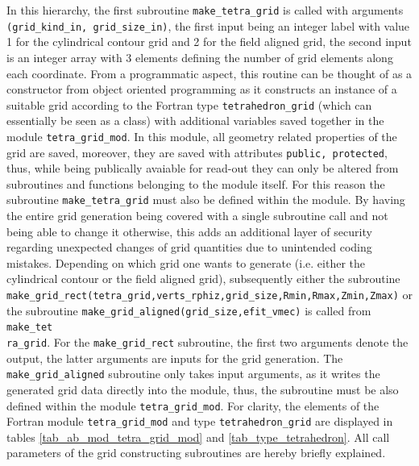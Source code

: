 \documentclass[./main.tex]{subfiles}
\begin{document}
In this hierarchy, the first subroutine \texttt{make\_tetra\_grid} is called with arguments \texttt{(grid\_kind\_in, grid\_size\_in)}, the first input being an integer label with value 1 for the cylindrical contour grid and 2 for the field aligned grid, the second input is an integer array with 3 elements defining the number of grid elements along each coordinate. From a programmatic aspect, this routine can be thought of as a constructor from object oriented programming as it constructs an instance of a suitable grid according to the Fortran type \texttt{tetrahedron\_grid} (which can essentially be seen as a class) with additional variables saved together in the module \texttt{tetra\_grid\_mod}. In this module, all geometry related properties of the grid are saved, moreover, they are saved with attributes \texttt{public, protected}, thus, while being publically avaiable for read-out they can only be altered from subroutines and functions belonging to the module itself. For this reason the subroutine \texttt{make\_tetra\_grid} must also be defined within the module. By having the entire grid generation being covered with a single subroutine call and not being able to change it otherwise, this adds an additional layer of security regarding unexpected changes of grid quantities due to unintended coding mistakes. 
Depending on which grid one wants to generate (i.e. either the cylindrical contour or the field aligned grid), subsequently either the subroutine \texttt{make\_grid\_rect(tetra\_grid,verts\_rphiz,grid\_size,Rmin,Rmax,Zmin,Zmax)} or the subroutine \texttt{make\_grid\_aligned(grid\_size,efit\_vmec)} is called from \texttt{make\_tet\\ra\_grid}. For the \texttt{make\_grid\_rect} subroutine, the first two arguments denote the output, the latter arguments are inputs for the grid generation. The \texttt{make\_grid\_aligned} subroutine only takes input arguments, as it writes the generated grid data directly into the module, thus, the subroutine must be also defined within the module \texttt{tetra\_grid\_mod}.
For clarity, the elements of the Fortran module \texttt{tetra\_grid\_mod} and type \texttt{tetrahedron\_grid} are displayed in tables \ref{tab_ab_mod_tetra_grid_mod} and \ref{tab_type_tetrahedron}. All call parameters of the grid constructing subroutines are hereby briefly explained.
\end{document}
